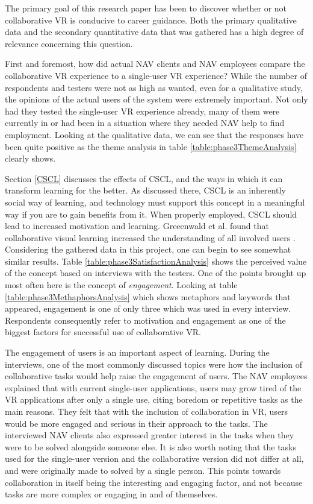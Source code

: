 The primary goal of this research paper has been to discover whether or not collaborative VR is conducive to career guidance. Both the primary qualitative data and the secondary quantitative data that was gathered has a high degree of relevance concerning this question. 

First and foremost, how did actual NAV clients and NAV employees compare the collaborative VR experience to a single-user VR experience? While the number of respondents and testers were not as high as wanted, even for a qualitative study, the opinions of the actual users of the system were extremely important. Not only had they tested the single-user VR experience already, many of them were currently in or had been in  a situation where they needed NAV help to find employment. Looking at the qualitative data, we can see that the responses have been quite positive as the theme analysis in table \ref{table:phase3ThemeAnalysis} clearly shows. 

Section \ref{CSCL} discusses the effects of CSCL, and the ways in which it can transform learning for the better. As discussed there, CSCL is an inherently social way of learning, and technology must support this concept in a meaningful way if you are to gain benefits from it. When properly employed, CSCL should lead to increased motivation and learning. Greeenwald et al. found that collaborative visual learning increased the understanding of all involved users \cite{greenwald2017technology}. Considering the gathered data in this project, one can begin to see somewhat similar results. Table \ref{table:phase3SatisfactionAnalysis} shows the perceived value of the concept based on interviews with the testers. One of the points brought up most often here is the concept of \textit{engagement}. Looking at table \ref{table:phase3MethaphorsAnalysis} which shows metaphors and keywords that appeared, engagement is one of only three which was used in every interview. Respondents consequently refer to motivation and engagement as one of the biggest factors for successful use of collaborative VR.

The engagement of users is an important aspect of learning. During the interviews, one of the most commonly discussed topics were how the inclusion of collaborative tasks would help raise the engagement of users. The NAV employees explained that with current single-user applications, users may grow tired of the VR applications after only a single use, citing boredom or repetitive tasks as the main reasons. They felt that with the inclusion of collaboration in VR, users would be more engaged and serious in their approach to the tasks. The interviewed NAV clients also expressed greater interest in the tasks when they were to be solved alongside someone else. It is also worth noting that the tasks used for the single-user version and the collaborative version did not differ at all, and were originally made to solved by a single person. This points towards collaboration in itself being the interesting and engaging factor, and not because tasks are more complex or engaging in and of themselves. 

